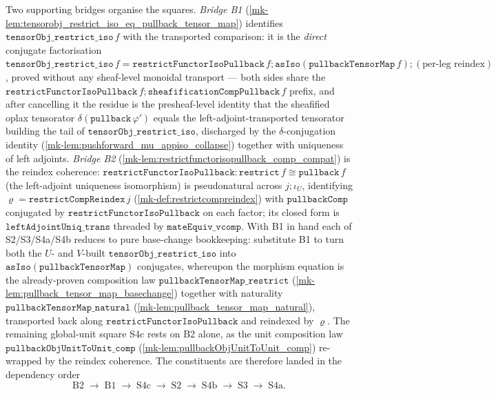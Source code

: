 Two supporting bridges organise the squares. \emph{Bridge B1}
(\ref{mk-lem:tensorobj_restrict_iso_eq_pullback_tensor_map}) identifies
\(\mathtt{tensorObj\_restrict\_iso}\,f\) with the transported comparison: it is the
\emph{direct} conjugate factorisation
\(\mathtt{tensorObj\_restrict\_iso}\,f = \mathtt{restrictFunctorIsoPullback}\,f \mathbin{;}
\mathtt{asIso}(\mathtt{pullbackTensorMap}\,f) \mathbin{;} (\text{per-leg reindex})\),
proved without any sheaf-level monoidal transport --- both sides share the
\(\mathtt{restrictFunctorIsoPullback}\,f \mathbin{;} \mathtt{sheafificationCompPullback}\,f\)
prefix, and after cancelling it the residue is the presheaf-level identity that the
sheafified oplax tensorator \(\delta(\mathtt{pullback}\,\varphi')\) equals the
left-adjoint-transported tensorator building the tail of \(\mathtt{tensorObj\_restrict\_iso}\),
discharged by the \(\delta\)-conjugation identity
(\ref{mk-lem:pushforward_mu_appiso_collapse}) together with uniqueness of left adjoints.
\emph{Bridge B2} (\ref{mk-lem:restrictfunctorisopullback_comp_compat}) is the reindex
coherence: \(\mathtt{restrictFunctorIsoPullback} : \mathtt{restrict}\,f \cong \mathtt{pullback}\,f\)
(the left-adjoint uniqueness isomorphism) is pseudonatural across \(j \mathbin{;} \iota_U\),
identifying \(\varrho = \mathtt{restrictCompReindex}\,j\) (\ref{mk-def:restrictcompreindex}) with
\(\mathtt{pullbackComp}\) conjugated by \(\mathtt{restrictFunctorIsoPullback}\) on each factor; its
closed form is \(\mathtt{leftAdjointUniq\_trans}\) threaded by \(\mathtt{mateEquiv\_vcomp}\).
With B1 in hand each of S2/S3/S4a/S4b reduces to pure base-change bookkeeping: substitute
B1 to turn both the \(U\)- and \(V\)-built \(\mathtt{tensorObj\_restrict\_iso}\) into
\(\mathtt{asIso}(\mathtt{pullbackTensorMap})\) conjugates, whereupon the morphism equation
is the already-proven composition law \(\mathtt{pullbackTensorMap\_restrict}\)
(\ref{mk-lem:pullback_tensor_map_basechange}) together with naturality
\(\mathtt{pullbackTensorMap\_natural}\) (\ref{mk-lem:pullback_tensor_map_natural}),
transported back along \(\mathtt{restrictFunctorIsoPullback}\) and reindexed by \(\varrho\).
The remaining global-unit square S4c rests on B2 alone, as the unit composition law
\(\mathtt{pullbackObjUnitToUnit\_comp}\) (\ref{mk-lem:pullbackObjUnitToUnit_comp}) re-wrapped by the
reindex coherence. The constituents are therefore landed in the dependency order
\[
  \mathrm{B2} \;\to\; \mathrm{B1} \;\to\; \mathrm{S4c} \;\to\; \mathrm{S2}
    \;\to\; \mathrm{S4b} \;\to\; \mathrm{S3} \;\to\; \mathrm{S4a}.
\]

